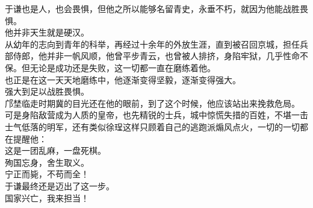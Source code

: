 \begin{multicols}{\theparacolNo}
于谦也是人，也会畏惧，但他之所以能够名留青史，永垂不朽，就因为他能战胜畏惧。\\

他并非天生就是硬汉。\\

从幼年的志向到青年的科举，再经过十余年的外放生涯，直到被召回京城，担任兵部侍郎，他并非一帆风顺，他曾平步青云，也曾被人排挤，身陷牢狱，几乎性命不保。但无论是成功还是失败，这一切都一直在磨练着他。\\

也正是在这一天天地磨练中，他逐渐变得坚毅，逐渐变得强大。\\

强大到足以战胜畏惧。\\

邝埜临走时期冀的目光还在他的眼前，到了这个时候，他应该站出来挽救危局。\\

可是身陷敌营成为人质的皇帝，也先精锐的士兵，城中惊慌失措的百姓，不堪一击士气低落的明军，还有类似徐珵这样只顾着自己的逃跑派煽风点火，一切的一切都在提醒他：\\

这是一团乱麻，一盘死棋。\\

殉国忘身，舍生取义。\\

宁正而毙，不苟而全！\\

于谦最终还是迈出了这一步。\\

国家兴亡，我来担当！\\
\ifnum{}
	\end{multicols}
\fi
\newpage
